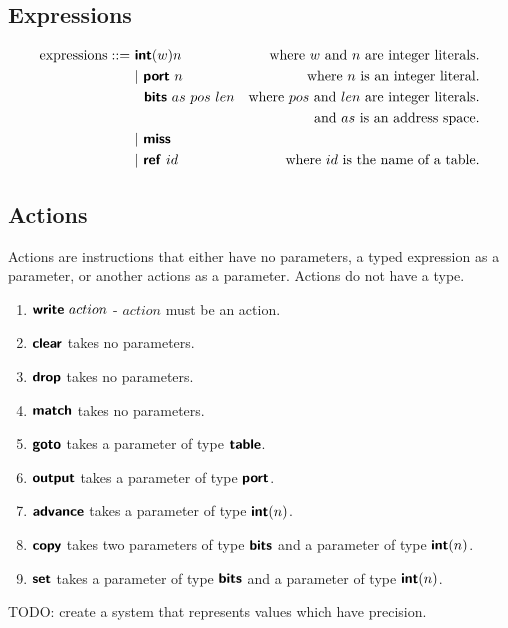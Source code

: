 \subsection{Expressions}
\begin{align*}
  \text{expressions} ::=~& \mathct{int}(w) n    & \text{where} \ w \ \text{and} \ n \ \text{are integer literals.}\\
  & | \ \mathct{port} \ n   & \text{where } n \text{ is an integer literal.}\\
  & \ \ \mathct{bits} \ as \ pos \ len &\text{where } pos \text{ and } len \text{ are integer literals.} \\ & &\text{and } as \text{ is an address space.}\\
  & | \ \mathct{miss}\\
  & | \ \mathct{ref} \ id    &\text{where } id \text{ is the name of a table.}
\end{align*}
\subsection{Actions}

Actions are instructions that either have no parameters, a typed expression as a parameter, or another actions as a parameter. Actions do not have a type.
\begin{enumerate}
  \item $\bm{\mathsf{{write}}} \ action$ - $action$ must be an action.
  \item $\bm{\mathsf{{clear}}}$ takes no parameters.
  \item $\bm{\mathsf{{drop}}}$ takes no parameters.
  \item $\bm{\mathsf{{match}}}$ takes no parameters.
  \item $\bm{\mathsf{{goto}}}$ takes a parameter of type $\bm{\mathsf{{table}}}$.
  \item $\bm{\mathsf{{output}}}$ takes a parameter of type $\bm{\mathsf{{port}}}$.
  \item $\bm{\mathsf{{advance}}}$ takes a parameter of type $\bm{\mathsf{{int}}}(n)$.
  \item $\bm{\mathsf{{copy}}}$ takes two parameters of type $\bm{\mathsf{{bits}}}$ and a parameter of type $\bm{\mathsf{{int}}}(n)$.
  \item $\bm{\mathsf{{set}}}$ takes a parameter of type $\bm{\mathsf{{bits}}}$ and a parameter of type $\bm{\mathsf{{int}}}(n)$.
\end{enumerate}

TODO: create a system that represents values which have precision.

